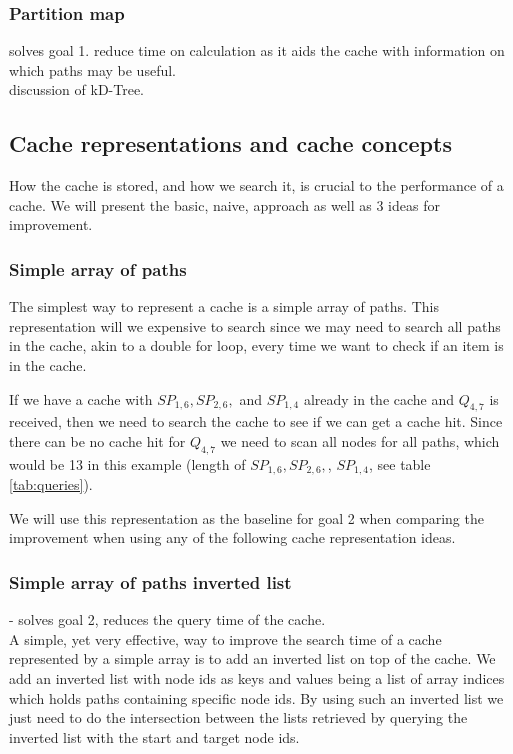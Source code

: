 \subsubsection{Partition map} 
solves goal 1. reduce time on \spath calculation as it aids the cache with information on which paths may be useful.\\ 
discussion of kD-Tree.


\subsection{Cache representations and cache concepts} \label{subsec:cacherepresentatons}
How the cache is stored, and how we search it, is crucial to the performance of a cache. We will present the basic, naive, approach as well as 3 ideas for improvement.

\subsubsection{Simple array of paths}%
The simplest way to represent a cache is a simple array of paths. This representation will we expensive to search since we may need to search all paths in the cache, akin to a double for loop, every time we want to check if an item is in the cache.

If we have a cache with $SP_{1,6},SP_{2,6},$ and $SP_{1,4}$ already in the cache and $Q_{4,7}$ is received, then we need to search the cache to see if we can get a cache hit. Since there can be no cache hit for $Q_{4,7}$ we need to scan all nodes for all paths, which would be 13 in this example (length of $SP_{1,6},SP_{2,6},$, $SP_{1,4}$, see table \ref{tab:queries}).

We will use this representation as the baseline for goal 2 when comparing the improvement when using any of the following cache representation ideas.

\subsubsection{Simple array of paths inverted list} - solves goal 2, reduces the query time of the cache.\\
A simple, yet very effective, way to improve the search time of a cache represented by a simple array is to add an inverted list on top of the cache. We add an inverted list with node ids as keys and values being a list of array indices which holds paths containing specific node ids. By using such an inverted list we just need to do the intersection between the lists retrieved by querying the inverted list with the start and target node ids. 


